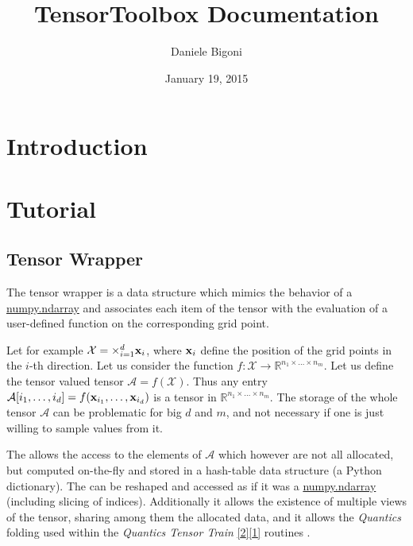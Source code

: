 \documentclass[a4paper,10pt,english]{sphinxmanual}
\title{TensorToolbox Documentation}
\date{January 19, 2015}
\author{Daniele Bigoni}
\begin{document}
\maketitle
\tableofcontents
{}\label{index::doc}



\chapter{Introduction}
\label{intro:introduction}\label{intro::doc}\label{intro:tensortoolbox-s-documentation}

\chapter{Tutorial}
\label{tutorial::doc}\label{tutorial:tutorial}

\section{Tensor Wrapper}
\label{tw:tensor-wrapper}\label{tw::doc}
The tensor wrapper is a data structure which mimics the behavior of a \href{http://docs.scipy.org/doc/numpy/index.html}{numpy.ndarray} and associates each item of the tensor with the evaluation of a user-defined function on the corresponding grid point.

Let for example \(\mathcal{X} = \times_{i=1}^d {\bf x}_i\), where \({\bf x}_i\) define the position of the grid points in the \(i\)-th direction. Let us consider the function \(f:\mathcal{X}\rightarrow \mathbb{R}^{n_1\times \ldots \times n_m}\). Let us define the tensor valued tensor \(\mathcal{A}=f(\mathcal{X})\). Thus any entry \(\mathcal{A}[i_1,\ldots,i_d] = f({\bf x}_{i_1},\ldots,{\bf x}_{i_d})\) is a tensor in \(\mathbb{R}^{n_1\times \ldots \times n_m}\). The storage of the whole tensor \(\mathcal{A}\) can be problematic for big \(d\) and \(m\), and not necessary if one is just willing to sample values from it.

The  allows the access to the elements of \(\mathcal{A}\) which however are not all allocated, but computed on-the-fly and stored in a hash-table data structure (a Python dictionary). The  can be reshaped and accessed as if it was a \href{http://docs.scipy.org/doc/numpy/index.html}{numpy.ndarray} (including slicing of indices). Additionally it allows the existence of multiple views of the tensor, sharing among them the allocated data, and it allows the \emph{Quantics} folding used within the \emph{Quantics Tensor Train} {\hyperref[zrefs:khoromskij2011]{{[}2{]}}}{\hyperref[zrefs:khoromskij2010]{{[}1{]}}} routines .
\end{document}
